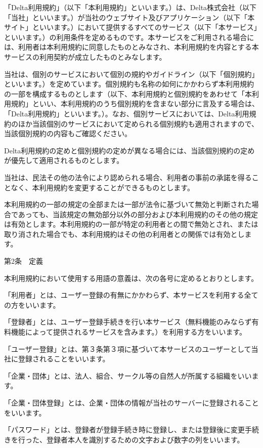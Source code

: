     「Delta利用規約」（以下「本利用規約」といいます。）は、Delta株式会社（以下「当社」といいます。）が当社のウェブサイト及びアプリケーション（以下「本サイト」といいます。）において提供するすべてのサービス（以下「本サービス」といいます。）の利用条件を定めるものです。本サービスをご利用される場合には、利用者は本利用規約に同意したものとみなされ、本利用規約を内容とする本サービスの利用契約が成立したものとみなします。

    当社は、個別のサービスにおいて個別の規約やガイドライン（以下「個別規約」といいます。）を定めています。個別規約も名称の如何にかかわらず本利用規約の一部を構成するものとします（以下、本利用規約と個別規約をあわせて「本利用規約」といい、本利用規約のうち個別規約を含まない部分に言及する場合は、「Delta利用規約」といいます。）。なお、個別サービスにおいては、Delta利用規約のほか当該個別のサービスにおいて定められる個別規約も適用されますので、当該個別規約の内容もご確認ください。

    Delta利用規約の定めと個別規約の定めが異なる場合には、当該個別規約の定めが優先して適用されるものとします。

    当社は、民法その他の法令により認められる場合、利用者の事前の承諾を得ることなく、本利用規約を変更することができるものとします。

    本利用規約の一部の規定の全部または一部が法令に基づいて無効と判断された場合であっても、当該規定の無効部分以外の部分および本利用規約のその他の規定は有効とします。本利用規約の一部が特定の利用者との間で無効とされ、または取り消された場合でも、本利用規約はその他の利用者との関係では有効とします。

第2条　定義

本利用規約において使用する用語の意義は、次の各号に定めるとおりとします。

    「利用者」とは、ユーザー登録の有無にかかわらず、本サービスを利用する全ての方をいいます。

    「登録者」とは、ユーザー登録手続きを行い本サービス（無料機能のみならず有料機能によって提供されるサービスを含みます。）を利用する方をいいます。

    「ユーザー登録」とは、第３条第３項に基づいて本サービスのユーザーとして当社に登録されることをいいます。

    「企業・団体」とは、法人、組合、サークル等の自然人が所属する組織をいいます。

    「企業・団体登録」とは、企業・団体の情報が当社のサーバーに登録されることをいいます。

    「パスワード」とは、登録者が登録手続き時に登録し、または登録後に変更手続きを行った、登録者本人を識別するための文字および数字の列をいいます。

